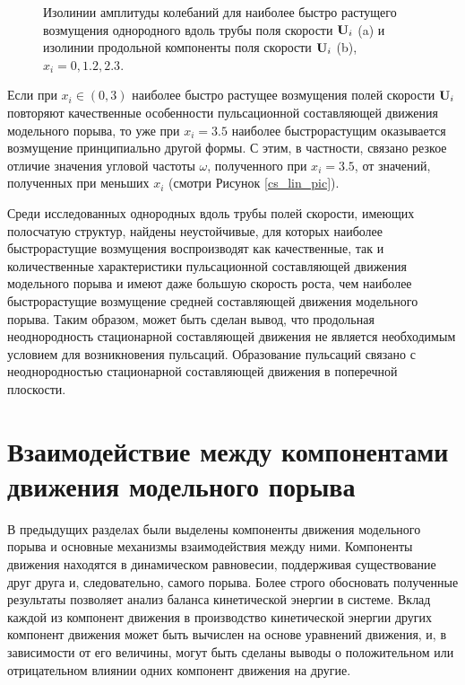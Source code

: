 \begin{figure}
\caption{Изолинии амплитуды колебаний для наиболее быстро растущего возмущения однородного вдоль трубы поля скорости $\mathbf{U}_i$ (a) и изолинии продольной компоненты поля скорости $\mathbf{U}_i$ (b), $x_i = 0, 1.2, 2.3$.}
\label{cs_lin_map_pic}
\end{figure}

Если при $x_i \in (0,3)$ наиболее быстро растущее возмущения полей скорости $\mathbf{U}_i$ повторяют качественные особенности пульсационной составляющей движения модельного порыва, то уже при $x_i = 3.5$ наиболее быстрорастущим оказывается возмущение принципиально другой формы. С этим, в частности, связано резкое отличие значения угловой частоты $\omega$, полученного при $x_i = 3.5$, от значений, полученных при меньших $x_i$ (смотри Рисунок \ref{cs_lin_pic}). 

Среди исследованных однородных вдоль трубы полей скорости, имеющих полосчатую структур, найдены неустойчивые, для которых наиболее быстрорастущие возмущения воспроизводят как качественные, так и количественные характеристики пульсационной составляющей движения модельного порыва и имеют даже большую скорость роста, чем наиболее быстрорастущие возмущение средней составляющей движения модельного порыва. Таким образом, может быть сделан вывод, что продольная неоднородность стационарной составляющей движения не является необходимым условием для возникновения пульсаций. Образование пульсаций связано с неоднородностью стационарной составляющей движения в поперечной плоскости. 


\section{Взаимодействие между компонентами движения модельного порыва}

В предыдущих разделах были выделены компоненты движения модельного порыва и основные механизмы взаимодействия между ними. Компоненты движения находятся в динамическом равновесии, поддерживая существование друг друга и, следовательно, самого порыва. Более строго обосновать полученные результаты позволяет анализ баланса кинетической энергии в системе. Вклад каждой из компонент движения в производство кинетической энергии других компонент движения может быть вычислен на основе уравнений движения, и, в зависимости от его величины, могут быть сделаны выводы о положительном или отрицательном влиянии одних компонент движения на другие. 

